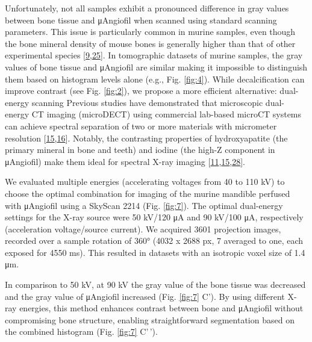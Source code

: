 Unfortunately, not all samples exhibit a pronounced difference in gray values between bone tissue and μAngiofil when scanned using standard scanning parameters.
This issue is particularly common in murine samples, even though the bone mineral density of mouse bones is generally higher than that of other experimental species {[}\protect\hyperlink{ref-FXSWRzX2}{9},\protect\hyperlink{ref-1AEVcopFo}{25}{]}.
In tomographic datasets of murine samples, the gray values of bone tissue and μAngiofil are similar making it impossible to distinguish them based on histogram levels alone (e.g., Fig. \ref{fig:4}).
While decalcification can improve contrast (see Fig. \ref{fig:2}), we propose a more efficient alternative: dual-energy scanning
Previous studies have demonstrated that microscopic dual-energy CT imaging (microDECT) using commercial lab-based microCT systems can achieve spectral separation of two or more materials with micrometer resolution {[}\protect\hyperlink{ref-191glo5Hi}{15},\protect\hyperlink{ref-w1AGMK3j}{16}{]}.
Notably, the contrasting properties of hydroxyapatite (the primary mineral in bone and teeth) and iodine (the high-Z component in μAngiofil) make them ideal for spectral X-ray imaging {[}\protect\hyperlink{ref-ZKU6zNgr}{11},\protect\hyperlink{ref-191glo5Hi}{15},\protect\hyperlink{ref-oRhGUhqB}{28}{]}.

We evaluated multiple energies (accelerating voltages from 40 to 110 kV) to choose the optimal combination for imaging of the murine mandible perfused with μAngiofil using a SkyScan 2214 (Fig. \ref{fig:7}).
The optimal dual-energy settings for the X-ray source were 50 kV/120 μA and 90 kV/100 μA, respectively (acceleration voltage/source current).
We acquired 3601 projection images, recorded over a sample rotation of 360° (4032 x 2688 px, 7 averaged to one, each exposed for 4550 ms).
This resulted in datasets with an isotropic voxel size of 1.4 μm.

In comparison to 50 kV, at 90 kV the gray value of the bone tissue was decreased and the gray value of μAngiofil increased (Fig. \ref{fig:7} C').
By using different X-ray energies, this method enhances contrast between bone and μAngiofil without compromising bone structure, enabling straightforward segmentation based on the combined histogram (Fig. \ref{fig:7} C'\,').

